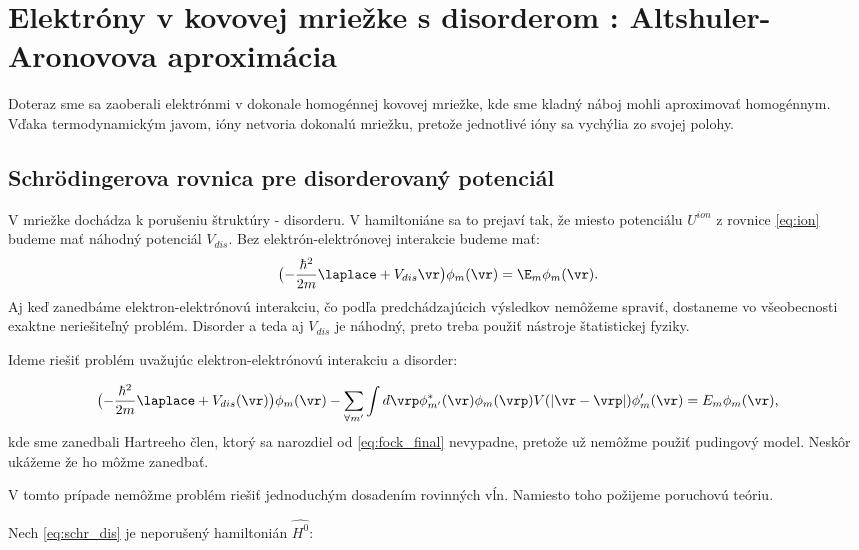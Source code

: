 \section{Elektróny v kovovej mriežke s disorderom : Altshuler-Aronovova aproximácia}
 Doteraz sme sa zaoberali elektrónmi v dokonale homogénnej kovovej mriežke, kde sme kladný náboj mohli aproximovať homogénnym.
 Vďaka termodynamickým javom, ióny netvoria dokonalú mriežku, pretože jednotlivé ióny sa vychýlia zo svojej polohy.
 \subsection{Schr\"odingerova rovnica pre disorderovaný potenciál}
 V mriežke dochádza k porušeniu štruktúry - disorderu. V hamiltoniáne sa to prejaví tak, že miesto potenciálu $U^{ion}$ z rovnice \eqref{eq:ion} budeme mať
 náhodný potenciál $V_{dis}$. Bez elektrón-elektrónovej interakcie budeme mať:
\begin{equation}
\label{eq:schr_dis}
\bigl(-\frac{\hbar^2}{2m}\laplace + V_{dis}{\vr}\bigr)\phi_m(\vr)=\E_m\phi_m(\vr) \text{.}
\end{equation}
Aj keď zanedbáme elektron-elektrónovú interakciu, čo podľa predchádzajúcich výsledkov nemôžeme spraviť, dostaneme vo všeobecnosti exaktne neriešiteľný problém.
Disorder a teda aj $V_{dis}$ je náhodný, preto treba použiť nástroje štatistickej fyziky.

Ideme riešiť problém uvažujúc elektron-elektrónovú interakciu a disorder:

\begin{equation}
 \label{eq:fock_dis}
 \bigl(-\frac{\hbar^2}{2m}\laplace + V_{dis}(\vr)\bigr)\phi_m(\vr)-\sum_{\forall m'} \int d\vrp \phi^*_{m'}(\vr)\phi_{m}(\vrp)V(|\vr-\vrp|)\phi_m'(\vr)=E_m\phi_m(\vr) \text{,}
\end{equation}
kde sme zanedbali Hartreeho člen, ktorý sa narozdiel od \eqref{eq:fock_final} nevypadne, pretože už nemôžme použiť pudingový model.
Neskôr ukážeme že ho môžme zanedbať.

V tomto prípade nemôžme problém riešiť jednoduchým dosadením rovinných vĺn. Namiesto toho požijeme poruchovú teóriu.

Nech \eqref{eq:schr_dis} je neporušený hamiltonián $\hat{H^{0}}$:

